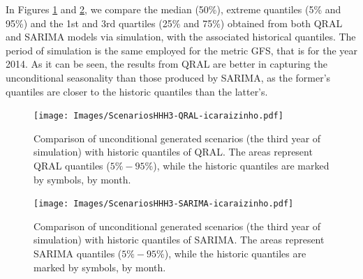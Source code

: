 In Figures \ref{fig:scenarios-qral} and \ref{fig:scenarios-sarima}, we compare the median (50\%), extreme quantiles (5\% and 95\%) and the 1st and 3rd quartiles (25\% and 75\%) obtained from  both QRAL and SARIMA models via simulation, with the associated historical quantiles. The period of simulation is the same employed for the metric GFS, that is for the year 2014. As it can be seen, the results from QRAL are better in capturing the unconditional seasonality than those produced by SARIMA, as the former's quantiles are closer to the historic quantiles than the latter's.


\begin{figure}[ht]
	\centering
	\texttt{[image: Images/ScenariosHHH3-QRAL-icaraizinho.pdf]}
	\caption{Comparison of unconditional generated scenarios (the third year of simulation) with historic quantiles of QRAL.  The areas represent QRAL quantiles ($5\%-95\%$),
	while the historic quantiles are marked by symbols, by month. }
	\label{fig:scenarios-qral}
\end{figure}

\begin{figure}[h]
	\centering
	\texttt{[image: Images/ScenariosHHH3-SARIMA-icaraizinho.pdf]}
	\caption{Comparison of unconditional generated scenarios (the third year of simulation) with historic quantiles of SARIMA. The areas represent SARIMA quantiles ($5\%-95\%$),
	while the historic quantiles are marked by symbols, by month. }
	\label{fig:scenarios-sarima}
\end{figure}
